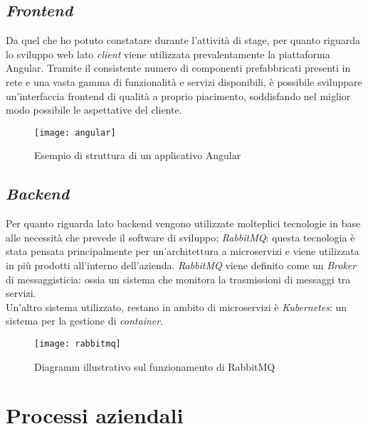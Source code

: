 \subsection{\textit{Frontend}}
Da quel che ho potuto constatare durante l'attività di stage, per quanto riguarda lo sviluppo web lato \textit{client} viene utilizzata prevalentamente la piattaforma Angular. Tramite il consistente numero di componenti prefabbricati presenti in rete e una vasta gamma di funzionalità e servizi disponibili, è possibile sviluppare un'interfaccia frontend di qualità a proprio piacimento, soddisfando nel miglior modo possibile le aspettative del cliente.
\begin{figure}[!h] 
	\centering 
	\texttt{[image: angular]} 
	\caption{Esempio di struttura di un applicativo Angular}
\end{figure}
\subsection{\textit{Backend}}
Per quanto riguarda lato backend vengono utilizzate molteplici tecnologie in base alle necessità che prevede il software di sviluppo;  \textit{RabbitMQ}: questa tecnologia è stata pensata principalmente per un'architettura a microservizi e viene utilizzata in più prodotti all'interno dell'azienda. \textit{RabbitMQ} viene definito come un \textit{Broker} di messaggisticia: ossia un sistema che monitora la trasmissioni di messaggi tra servizi.\\ Un'altro sistema utilizzato, restano in ambito di microservizi è \textit{Kubernetes}: un sistema per la gestione di \textit{container}.

\begin{figure}[!h] 
	\centering 
	\texttt{[image: rabbitmq]} 
	\caption{Diagramm illustrativo sul funzionamento di RabbitMQ}
\end{figure}
\section {Processi aziendali}
